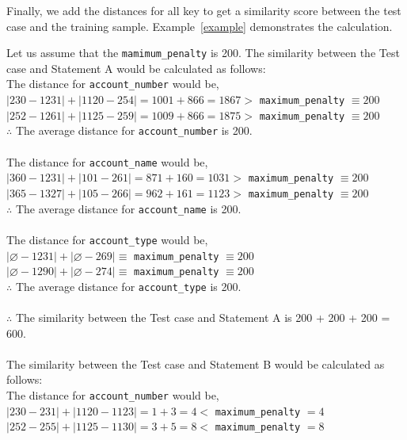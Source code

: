\documentclass[runningheads]{llncs}
\begin{document}
Finally, we add the distances for all key to get a similarity score between the test case and the training sample. Example~\ref{example} demonstrates the calculation.
\begin{example}\label{example}
Let us assume that the \texttt{mamimum\_penalty} is 200. The similarity between the Test case and Statement A would be calculated as follows:\\
The distance for \texttt{account\_number} would be,\\
$| 230 - 1231 | + | 1120 - 254 | = 1001 + 866  = 1867 > $ \texttt{maximum\_penalty} $ \equiv 200$\\
$| 252 - 1261 | + | 1125 - 259 | = 1009 + 866  = 1875 > $ \texttt{maximum\_penalty} $ \equiv 200$\\
$\therefore$ The average distance for \texttt{account\_number} is 200.\\
\\
The distance for \texttt{account\_name} would be,\\
$| 360 - 1231 | + | 101 - 261 | = 871 + 160  = 1031 > $ \texttt{maximum\_penalty} $ \equiv 200$\\
$| 365 - 1327 | + | 105 - 266 | = 962 + 161  = 1123 > $ \texttt{maximum\_penalty} $ \equiv 200$\\
$\therefore$ The average distance for \texttt{account\_name} is 200.\\
\\
The distance for \texttt{account\_type} would be,\\
$| \varnothing- 1231 | + | \varnothing - 269 | \equiv $ \texttt{maximum\_penalty} $ \equiv 200$\\
$| \varnothing - 1290 | + | \varnothing - 274 | \equiv $ \texttt{maximum\_penalty} $ \equiv 200$\\
$\therefore$ The average distance for \texttt{account\_type} is 200.\\
\\
$\therefore$ The similarity between the Test case and Statement A is 200 + 200 + 200 = 600.\\
\\
The similarity between the Test case and Statement B would be calculated as follows:\\
The distance for \texttt{account\_number} would be,\\
$| 230 - 231 | + | 1120 - 1123 | = 1 + 3  = 4 < $ \texttt{maximum\_penalty} $= 4$\\
$| 252 - 255 | + | 1125 - 1130 | = 3 + 5  = 8 < $ \texttt{maximum\_penalty} $= 8$\\

\end{example}
\end{document}
